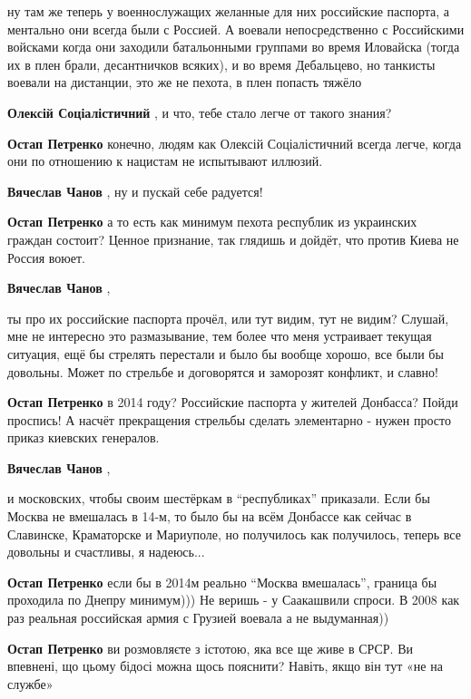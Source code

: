 \begin{itemize}
\begin{itemize}
ну там же теперь у военнослужащих желанные для них российские паспорта, а
ментально они всегда были с Россией. А воевали непосредственно с Российскими
войсками когда они заходили батальонными группами во время Иловайска (тогда их
в плен брали, десантничков всяких), и во время Дебальцево, но танкисты воевали
на дистанции, это же не пехота, в плен попасть тяжёло

\textbf{Олексій Соціалістичний} , и что, тебе стало легче от такого знания?

\textbf{Остап Петренко} конечно, людям как Олексій Соціалістичний всегда легче, когда они по отношению к нацистам не испытывают иллюзий.

\textbf{Вячеслав Чанов} , ну и пускай себе радуется!

\textbf{Остап Петренко} а то есть как минимум пехота республик из украинских граждан состоит? Ценное признание, так глядишь и дойдёт, что против Киева не Россия воюет.

\textbf{Вячеслав Чанов} , 

ты про их российские паспорта прочёл, или тут видим, тут не видим? Слушай, мне
не интересно это размазывание, тем более что меня устраивает текущая ситуация,
ещё бы стрелять перестали и было бы вообще хорошо, все были бы довольны. Может
по стрельбе и договорятся и заморозят конфликт, и славно!


\textbf{Остап Петренко} в 2014 году? Российские паспорта у жителей Донбасса?
Пойди проспись!
А насчёт прекращения стрельбы сделать элементарно - нужен просто приказ киевских генералов.

\textbf{Вячеслав Чанов} , 

и московских, чтобы своим шестёркам в \enquote{республиках} приказали. Если бы
Москва не вмешалась в 14-м, то было бы на всём Донбассе как сейчас в Славинске,
Краматорске и Мариуполе, но получилось как получилось, теперь все довольны и
счастливы, я надеюсь...


\textbf{Остап Петренко} если бы в 2014м реально \enquote{Москва вмешалась}, граница бы проходила по Днепру минимум)))
Не веришь - у Саакашвили спроси. В 2008 как раз реальная российская армия с Грузией воевала а не выдуманная))

\textbf{Остап Петренко} ви розмовляєте з істотою, яка все ще живе в СРСР. Ви впевнені, що цьому бідосі можна щось пояснити? Навіть, якщо він тут «не на службе»


\end{itemize}
\end{itemize}
